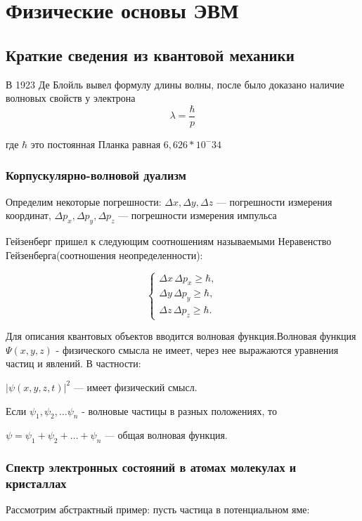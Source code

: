 \documentclass[../main.tex]{subfiles}
\begin{document}
\chapter{Физические основы ЭВМ}

\section{Краткие сведения из квантовой механики}
В 1923 Де Блойль вывел формулу длины волны, после было доказано наличие волновых свойств у электрона
\[\lambda = \frac{\hbar}{p}\]
\begin{center}
    где $\hbar$ это постоянная Планка равная $6,626 * 10 ^-34$
\end{center}
\subsection{Корпускулярно-волновой дуализм}
Определим некоторые погрешности: $\Delta x, \Delta y, \Delta z$ --- погрешности измерения координат,
 $\Delta p_x, \Delta p_y, \Delta p_z$ --- погрешности измерения импульса

Гейзенберг пришел к следующим соотношениям называемыми Неравенство Гейзенберга(соотношения неопределенности):

\[
\begin{cases}
\Delta x\,\Delta p_x \ge \hbar,\\
\Delta y\,\Delta p_y \ge \hbar,\\
\Delta z\,\Delta p_z \ge \hbar.
\end{cases}
\]

Для описания квантовых объектов вводится волновая функция.Волновая функция $\Psi(x,y,z)$ - физического смысла не имеет, через нее выражаются
уравнения частиц и явлений. В частности: 

\(\displaystyle |\psi(x,y,z,t)|^2\) — имеет физический смысл.

\vspace{10px}

Если $\psi_1, \psi_2, \ldots \psi_n$ - волновые частицы в разных положениях, то

\(\displaystyle \psi = \psi_1 + \psi_2 + \ldots + \psi_n\) — общая волновая функция.


\subsection{Спектр электронных состояний в атомах молекулах и кристаллах}
Рассмотрим абстрактный пример: пусть частица в потенциальном яме:
\end{document}
